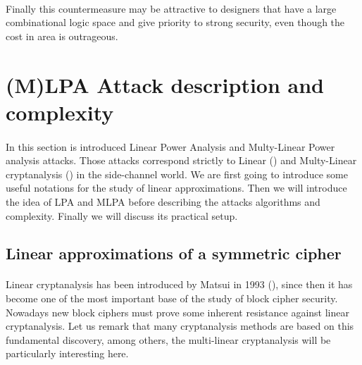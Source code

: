 \documentclass[11pt,a4paper]{article}
\begin{document}
{{{{{{{\paragraph{}
Finally this countermeasure may be attractive to designers that have a large combinational logic space and give priority to strong security, even though the cost in area is outrageous. 

\section{(M)LPA Attack description and complexity}
\paragraph{}
In this section is introduced Linear Power Analysis and Multy-Linear Power analysis attacks. Those attacks correspond strictly to Linear (\cite{Matsui93}) and Multy-Linear cryptanalysis 
(\cite{KaliskiRobshaw94}) in the side-channel world. We are first going to introduce some useful notations for the study of linear approximations. Then we will introduce the idea of LPA and MLPA 
before describing the attacks algorithms and complexity. Finally we will discuss its practical setup. 
\subsection{Linear approximations of a symmetric cipher}
\label{subsec:linearapprox}
\paragraph{}
Linear cryptanalysis has been introduced by Matsui in 1993 (\cite{Matsui93}), since then it has become one of the most important base of the study of block cipher security. Nowadays new block ciphers 
must prove some inherent resistance against linear cryptanalysis. Let us remark that many cryptanalysis methods are based on this fundamental discovery, among others, the multi-linear cryptanalysis 
\cite{KaliskiRobshaw94, BiryukovDeCannireQuisquater04} will be particularly interesting here.
\vspace{1ex} \\
}}}}}}}
\end{document}
